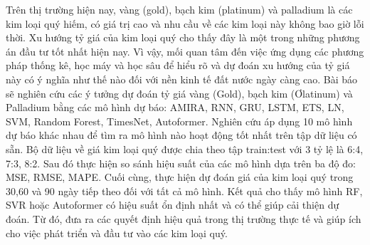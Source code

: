 Trên thị trường hiện nay, vàng (gold), bạch kim (platinum) và palladium là các kim loại quý hiếm, có giá trị cao và nhu cầu về các kim loại này không bao giờ lỗi thời. Xu hướng tỷ giá của kim loại quý cho thấy đây là một trong những phương án đầu tư tốt nhất hiện nay. Vì vậy, mối quan tâm đến việc ứng dụng các phương pháp thống kê, học máy và học sâu để hiểu rõ và dự đoán xu hướng của tỷ giá này có ý nghĩa như thế nào đối với nền kinh tế đất nước ngày càng cao. Bài báo sẽ nghiên cứu các ý tưởng dự đoán tỷ giá vàng (Gold), bạch kim (Ơlatinum) và Palladium bằng các mô hình dự báo: AMIRA, RNN, GRU, LSTM, ETS, LN, SVM, Random Forest, TimesNet, Autoformer. Nghiên cứu áp dụng 10 mô hình dự báo khác nhau để tìm ra mô hình nào hoạt động tốt nhất trên tập dữ liệu có sẵn. Bộ dữ liệu về giá kim loại quý được chia theo tập train:test với 3 tỷ lệ là 6:4, 7:3, 8:2. Sau đó  thực hiện so sánh hiệu suất của các mô hình dựa trên ba độ đo: MSE, RMSE, MAPE. Cuối cùng, thực hiện dự đoán giá của kim loại quý trong 30,60 và 90 ngày tiếp theo đối với tất cả mô hình. Kết quả cho thấy mô hình RF, SVR hoặc Autoformer có hiệu suất ổn định nhất và có thể giúp cải thiện dự đoán. Từ đó, đưa ra các quyết định hiệu quả trong thị trường thực tế và giúp ích cho việc phát triển và đầu tư vào các kim loại quý.